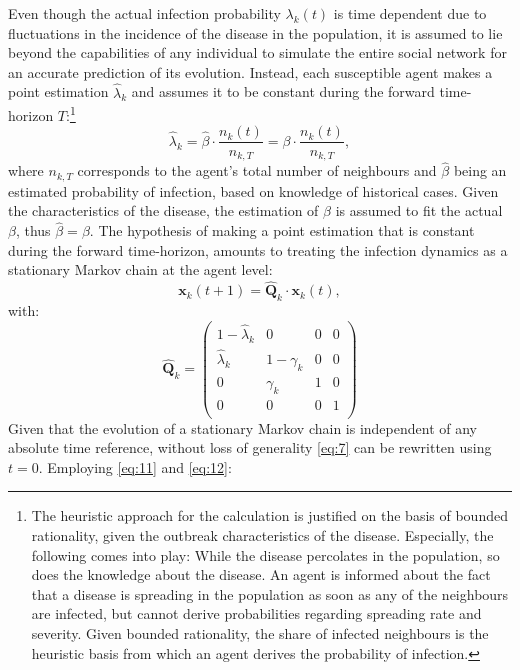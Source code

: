 \documentclass[11pt]{article}
\begin{document}
Even though the actual infection probability  \(\lambda_{k}(t)\) is time dependent due to fluctuations in the incidence of the disease in the population, it is assumed to lie beyond the capabilities of any individual to simulate the entire social network for an accurate prediction of its evolution. Instead, each susceptible agent makes a point estimation \(\hat{\lambda}_{k}\) and assumes it to be constant during the forward time-horizon \(T\):\footnote{The heuristic approach for the calculation is justified on the basis of bounded rationality, given the outbreak characteristics of the disease. Especially, the following comes into play: While the disease percolates in the population, so does the knowledge about the disease. An agent is informed about the fact that a disease is spreading in the population as soon as any of the neighbours are infected, but cannot derive probabilities regarding spreading rate and severity. Given bounded rationality, the share of infected neighbours is the heuristic basis from which an agent derives the probability of infection. }
\begin{equation}\label{eq:10}
 	\hat{\lambda}_{k}=\hat{\beta} \cdot \frac{n_{k}(t)}{n_{k,T}}=\beta \cdot \frac{n_{k}(t)}{n_{k,T}}, 
\end{equation}
where \(n_{k,T}\) corresponds to the agent's total number of neighbours and \(\hat{\beta}\) being an estimated probability of infection, based on knowledge of historical cases. Given the characteristics of the disease, the estimation of \(\hat{\beta}\) is assumed to fit the actual \(\beta\), thus \(\hat{\beta}=\beta\). The hypothesis of making a point estimation that is constant during the forward time-horizon, amounts to treating the infection dynamics as a stationary Markov chain at the agent level:
\begin{equation}\label{eq:11}
	 \mathbf{x}_k(t+1) = \hat{\mathbf{Q}}_k \cdot \mathbf{x}_k(t),
\end{equation}
with:
\begin{equation}\label{eq:12}
	 \hat{\mathbf{Q}}_k = 
	 \left (\begin{array}{cccc} 1-\hat{\lambda}_{k}&0&0&0 \\
	 	\hat{\lambda}_{k}&1-\gamma_{k}&0&0 \\
		0&\gamma_{k}&1&0 \\
		0&0&0&1 \\
	  \end{array} \right)
\end{equation}
Given that the evolution of a stationary Markov chain is independent of any absolute time reference, without loss of generality \eqref{eq:7} can be rewritten using \(t = 0\). Employing \eqref{eq:11} and \eqref{eq:12}:
\end{document}
